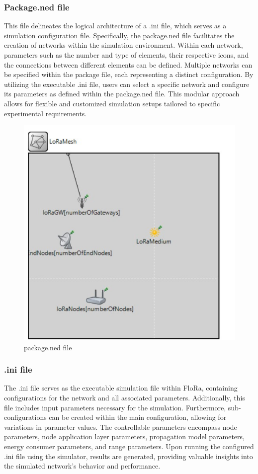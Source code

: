 \subsubsection{Package.ned file}

This file delineates the logical architecture of a .ini file, which serves as a simulation configuration file. Specifically, the package.ned file facilitates the creation of networks within the simulation environment. Within each network, parameters such as the number and type of elements, their respective icons, and the connections between different elements can be defined. Multiple networks can be specified within the package file, each representing a distinct configuration. By utilizing the executable .ini file, users can select a specific network and configure its parameters as defined within the package.ned file. This modular approach allows for flexible and customized simulation setups tailored to specific experimental requirements.\\

            \begin{figure}[h!]
                \centering
                \includegraphics[width=0.5\columnwidth]{images/package.jpg}
                \caption{package.ned file}
                \label{fig:package.ned}
            \end{figure}

\subsubsection{.ini file}

The .ini file serves as the executable simulation file within FloRa, containing configurations for the network and all associated parameters. Additionally, this file includes input parameters necessary for the simulation. Furthermore, sub-configurations can be created within the main configuration, allowing for variations in parameter values. The controllable parameters encompass node parameters, node application layer parameters, propagation model parameters, energy consumer parameters, and range parameters. Upon running the configured .ini file using the simulator, results are generated, providing valuable insights into the simulated network's behavior and performance.\\

